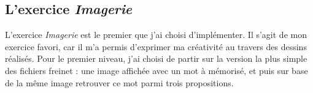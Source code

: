 




\subsection{L'exercice \textit{Imagerie}}
L'exercice \textit{Imagerie} est le premier que j'ai choisi d'implémenter. Il s'agit de mon exercice favori, car il m'a permis d'exprimer ma créativité au travers des dessins réalisés. Pour le premier niveau, j'ai choisi de partir sur la version la plus simple des fichiers freinet : une image affichée avec un mot à mémorisé, et puis sur base de la même image retrouver ce mot parmi trois propositions.\\


